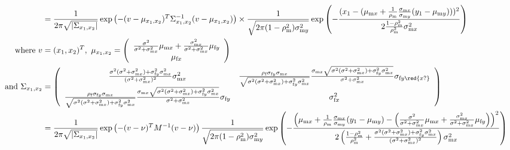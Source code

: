 \documentclass{article}
\newcommand{\x}[1]{\text{#1}}
\begin{document}
\begin{landscape}
\begin{align*}
\\&=\frac{1}{2\pi\sqrt{|\Sigma_{x_1,x_2}|}}\exp\left(-(v-\mu_{x_1,x_2})^T\Sigma_{x_1,x_2}^{-1}(v-\mu_{x_1,x_2})\right)\times\frac{1}{\sqrt{2\pi(1-\rho_\x{m}^2)\sigma_{\x{m}y}^2}}\exp\left(-\frac{(x_1-(\mu_{\x{m}x}+\frac{1}{\rho_\x{m}}\frac{\sigma_{\x{m}x}}{\sigma_{\x{m}y}}(y_1-\mu_{\x{m}y})))^2}{2\frac{1-\rho_\x{m}^2}{\rho_\x{m}^2}\sigma_{\x{m}x}^2}\right)
\\ \text{ where }  v&=(x_1,x_2)^T, \ \mu_{x_1,x_2}=\left(\begin{array}{cc}\frac{\sigma^2}{\sigma^2+\sigma_{\x{m}x}^2}\mu_{\x{m}x}+\frac{\sigma_{\x{m}x}^2}{\sigma^2+\sigma_{\x{m}x}^2}\mu_{\x{f}y} \\ \mu_{\x{f}x} \end{array}\right)
\\ \text{ and  } \Sigma_{x_1,x_2} &= \left(\begin{array}{cc}\frac{\sigma^2(\sigma^2+\sigma_{\x{m}x}^2)+\sigma_{\x{f}y}^2\sigma_{\x{m}x}^2}{(\sigma^2+\sigma_{\x{m}x}^2)^2}\sigma_{\x{m}x}^2 & \frac{\rho_\x{f}\sigma_{\x{f}y}\sigma_{\x{m}x}}{\sqrt{\sigma^2(\sigma^2+\sigma_{\x{m}x}^2)+\sigma_{\x{f}y}^2\sigma_{\x{m}x}^2}}\frac{\sigma_{\x{m}x}\sqrt{\sigma^2(\sigma^2+\sigma_{\x{m}x}^2)+\sigma_{\x{f}y}^2\sigma_{\x{m}x}^2}}{\sigma^2+\sigma_{\x{m}x}^2}\sigma_{\x{f}y\red{x?}} \\ \frac{\rho_\x{f}\sigma_{\x{f}y}\sigma_{\x{m}x}}{\sqrt{\sigma^2(\sigma^2+\sigma_{\x{m}x}^2)+\sigma_{\x{f}y}^2\sigma_{\x{m}x}^2}}\frac{\sigma_{\x{m}x}\sqrt{\sigma^2(\sigma^2+\sigma_{\x{m}x}^2)+\sigma_{\x{f}y}^2\sigma_{\x{m}x}^2}}{\sigma^2+\sigma_{\x{m}x}^2}\sigma_{\x{f}y} & \sigma_{\x{f}x}^2 \end{array}\right)
\\&=\frac{1}{2\pi\sqrt{|\Sigma_{x_1,x_2}|}}\exp\left(-(v-\nu)^TM^{-1}(v-\nu)\right)\frac{1}{\sqrt{2\pi(1-\rho_\x{m}^2)\sigma_{\x{m}y}^2}}\exp\left(-\frac{\left(\mu_{\x{m}x}+\frac{1}{\rho_\x{m}}\frac{\sigma_{\x{m}x}}{\sigma_{\x{m}y}}(y_1-\mu_{\x{m}y})-\left(\frac{\sigma^2}{\sigma^2+\sigma_{\x{m}x}^2}\mu_{\x{m}x}+\frac{\sigma_{\x{m}x}^2}{\sigma^2+\sigma_{\x{m}x}^2}\mu_{\x{f}y}\right)\right)^2}{2\left(\frac{1-\rho_\x{m}^2}{\rho_\x{m}^2}+\frac{\sigma^2(\sigma^2+\sigma_{\x{m}x}^2)+\sigma_{\x{f}y}^2\sigma_{\x{m}x}^2}{(\sigma^2+\sigma_{\x{m}x}^2)^2}\right)\sigma_{\x{m}x}^2}\right)
\end{align*}


\end{landscape}
\end{document}
